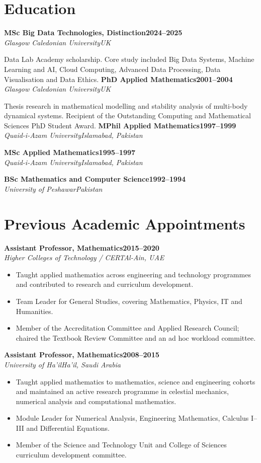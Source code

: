 \documentclass[10pt,a4paper]{article}
\newcommand{\cvrole}[4]{\textbf{#1}\hfill\textbf{#2}\\[-1pt]\textit{#3}\hfill\textit{#4}\par}
\begin{document}
\section{Education}
\cvrole{MSc Big Data Technologies, Distinction}{2024--2025}{Glasgow Caledonian University}{UK}
Data Lab Academy scholarship. Core study included Big Data Systems, Machine Learning and AI, Cloud Computing, Advanced Data Processing, Data Visualisation and Data Ethics.
\cvrole{PhD Applied Mathematics}{2001--2004}{Glasgow Caledonian University}{UK}
Thesis research in mathematical modelling and stability analysis of multi-body dynamical systems. Recipient of the Outstanding Computing and Mathematical Sciences PhD Student Award.
\cvrole{MPhil Applied Mathematics}{1997--1999}{Quaid-i-Azam University}{Islamabad, Pakistan}
\cvrole{MSc Applied Mathematics}{1995--1997}{Quaid-i-Azam University}{Islamabad, Pakistan}
\cvrole{BSc Mathematics and Computer Science}{1992--1994}{University of Peshawar}{Pakistan}

\section{Previous Academic Appointments}
\cvrole{Assistant Professor, Mathematics}{2015--2020}{Higher Colleges of Technology / CERT}{Al-Ain, UAE}
\begin{itemize}
\item Taught applied mathematics across engineering and technology programmes and contributed to research and curriculum development.
\item Team Leader for General Studies, covering Mathematics, Physics, IT and Humanities.
\item Member of the Accreditation Committee and Applied Research Council; chaired the Textbook Review Committee and an ad hoc workload committee.
\end{itemize}

\cvrole{Assistant Professor, Mathematics}{2008--2015}{University of Ha'il}{Ha'il, Saudi Arabia}
\begin{itemize}
\item Taught applied mathematics to mathematics, science and engineering cohorts and maintained an active research programme in celestial mechanics, numerical analysis and computational mathematics.
\item Module Leader for Numerical Analysis, Engineering Mathematics, Calculus I--III and Differential Equations.
\item Member of the Science and Technology Unit and College of Sciences curriculum development committee.
\end{itemize}
\end{document}
